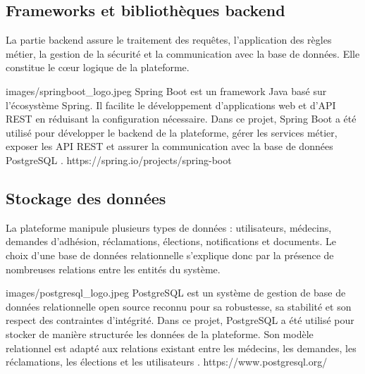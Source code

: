 ﻿\documentclass[12pt,a4paper]{report}
\begin{document}
\subsection{Frameworks et bibliothèques backend}

La partie backend assure le traitement des requêtes, l'application des règles
métier, la gestion de la sécurité et la communication avec la base de données.
Elle constitue le cœur logique de la plateforme.

\techno
{images/springboot_logo.jpeg}
{Spring Boot}
{est un framework Java basé sur l'écosystème Spring. Il facilite le
développement d'applications web et d'API REST en réduisant la configuration
nécessaire. Dans ce projet, Spring Boot a été utilisé pour développer le
backend de la plateforme, gérer les services métier, exposer les API REST et
assurer la communication avec la base de données PostgreSQL \cite{springBootDocs}.}
{https://spring.io/projects/spring-boot}


\subsection{Stockage des données}

La plateforme manipule plusieurs types de données : utilisateurs, médecins,
demandes d'adhésion, réclamations, élections, notifications et documents. Le
choix d'une base de données relationnelle s'explique donc par la présence de
nombreuses relations entre les entités du système.

\techno
{images/postgresql_logo.jpeg}
{PostgreSQL}
{est un système de gestion de base de données relationnelle open source
reconnu pour sa robustesse, sa stabilité et son respect des contraintes
d'intégrité. Dans ce projet, PostgreSQL a été utilisé pour stocker de manière
structurée les données de la plateforme. Son modèle relationnel est adapté aux
relations existant entre les médecins, les demandes, les réclamations, les
élections et les utilisateurs \cite{postgresDocs}.}
{https://www.postgresql.org/}
\end{document}
